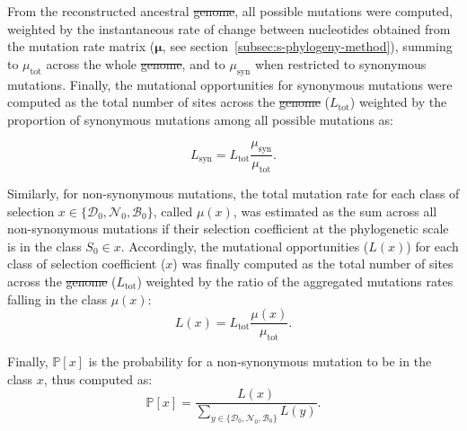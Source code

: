 \documentclass{article}
\newcommand{\UniDimArray}[1]{\bm{#1}}
\newcommand{\proba}{\mathbb{P}}
\newcommand{\Sphy}{S_{0}}
\newcommand{\SphyDel}{\mathcal{D}_0}
\newcommand{\SphyNeu}{\mathcal{N}_0}
\newcommand{\SphyBen}{\mathcal{B}_0}
\newcommand{\Sphyclass}{x}
\newcommand{\SphyclassAlt}{y}
\providecommand{\DIFaddtex}[1]{{\protect\color{blue}\uwave{#1}}} %
\providecommand{\DIFdeltex}[1]{{\protect\color{red}\sout{#1}}}                      %
\providecommand{\DIFaddbegin}{} %
\providecommand{\DIFaddend}{} %
\providecommand{\DIFdelbegin}{} %
\providecommand{\DIFdelend}{} %
\providecommand{\DIFadd}[1]{\texorpdfstring{\DIFaddtex{#1}}{#1}} %
\providecommand{\DIFdel}[1]{\texorpdfstring{\DIFdeltex{#1}}{}} %
\newcommand{\DIFscaledelfig}{0.5}
\newlength{\DIFdelgraphicswidth} %
\newlength{\DIFdelgraphicsheight} %
\newcommand{\DIFaddincludegraphics}[2][]{{\color{blue}\fbox{\DIFOincludegraphics[#1]{#2}}}} %
\newcommand{\DIFdelincludegraphics}[2][]{%
\sbox{\DIFdelgraphicsbox}{\DIFOincludegraphics[#1]{#2}}%
\settoboxwidth{\DIFdelgraphicswidth}{\DIFdelgraphicsbox} %
\settoboxtotalheight{\DIFdelgraphicsheight}{\DIFdelgraphicsbox} %
\scalebox{\DIFscaledelfig}{%
\parbox[b]{\DIFdelgraphicswidth}{\usebox{\DIFdelgraphicsbox}\\[-\baselineskip] \rule{\DIFdelgraphicswidth}{0em}}\llap{\resizebox{\DIFdelgraphicswidth}{\DIFdelgraphicsheight}{%
\setlength{\unitlength}{\DIFdelgraphicswidth}%
\begin{picture}(1,1)%
\thicklines\linethickness{2pt} %
{\color[rgb]{1,0,0}\put(0,0){\framebox(1,1){}}}%
{\color[rgb]{1,0,0}\put(0,0){\line( 1,1){1}}}%
{\color[rgb]{1,0,0}\put(0,1){\line(1,-1){1}}}%
\end{picture}%
}\hspace*{3pt}}} %
} %
\DeclareRobustCommand{\DIFaddbegin}{\DIFOaddbegin \let\includegraphics\DIFaddincludegraphics} %
\DeclareRobustCommand{\DIFaddend}{\DIFOaddend \let\includegraphics\DIFOincludegraphics} %
\DeclareRobustCommand{\DIFdelbegin}{\DIFOdelbegin \let\includegraphics\DIFdelincludegraphics} %
\DeclareRobustCommand{\DIFdelend}{\DIFOaddend \let\includegraphics\DIFOincludegraphics} %
\begin{document}
    From the reconstructed ancestral \DIFdelbegin \DIFdel{genome}\DIFdelend \DIFaddbegin \DIFadd{exome}\DIFaddend , all possible mutations were computed, weighted by the instantaneous rate of change between nucleotides obtained from the mutation rate matrix ($\UniDimArray{\mu}$, see section~\ref{subsec:s-phylogeny-method}), summing to $\mu_{\text{tot}}$ across the whole \DIFdelbegin \DIFdel{genome}\DIFdelend \DIFaddbegin \DIFadd{exome}\DIFaddend , and to $\mu_{\text{syn}}$ when restricted to synonymous mutations.
    Finally, the mutational opportunities for synonymous mutations were computed as the total number of sites across the \DIFdelbegin \DIFdel{genome }\DIFdelend \DIFaddbegin \DIFadd{exome }\DIFaddend ($L_{\text{tot}}$) weighted by the proportion of synonymous mutations among all possible mutations as:

    \begin{equation}
        L_{\text{syn}} = L_{\text{tot}} \frac{\mu_{\text{syn}}}{\mu_{\text{tot}}}.
    \end{equation}

    Similarly, for non-synonymous mutations, the total mutation rate for each class of selection $\Sphyclass \in \{\SphyDel, \SphyNeu, \SphyBen \}$, called $\mu\left( \Sphyclass \right)$, was estimated as the sum across all non-synonymous mutations if their selection coefficient at the phylogenetic scale is in the class $\Sphy \in \Sphyclass$.
    Accordingly, the mutational opportunities ($L \left( \Sphyclass \right)$) for each class of selection coefficient ($\Sphyclass$) was finally computed as the total number of sites across the \DIFdelbegin \DIFdel{genome }\DIFdelend \DIFaddbegin \DIFadd{exome }\DIFaddend ($L_{\text{tot}}$) weighted by the ratio of the aggregated mutations rates falling in the class $\mu\left( \Sphyclass \right)$:
    \begin{equation}
        L \left( \Sphyclass \right) = L_{\text{tot}} \frac{\mu\left( \Sphyclass \right)}{\mu_{\text{tot}}}.\label{eq:mutation-opp}
    \end{equation}

    Finally, $\proba [ \Sphyclass ]$ is the probability for a non-synonymous mutation to be in the class $\Sphyclass$, thus computed as:
    \begin{equation}
        \proba[\Sphyclass] = \frac{L\left( \Sphyclass \right)}{\sum_{\SphyclassAlt\in \{\SphyDel, \SphyNeu, \SphyBen \} } L\left(\SphyclassAlt \right)}.\label{eq:proba-dfe-mutsel}
    \end{equation}
\end{document}
